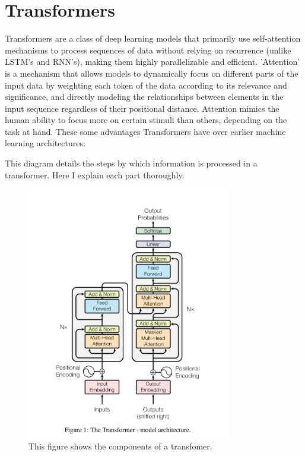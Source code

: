 \documentclass[12pt]{article}
\begin{document}
\section{Transformers}
Transformers are a class of deep learning models that primarily use self-attention mechanisms to process sequences of data without relying on recurrence (unlike LSTM's and RNN's), making them highly parallelizable and efficient. 'Attention' is a mechanism that allows models to dynamically focus on different parts of the input data by weighting each token of the data according to its relevance and significance, and directly modeling the relationships between elements in the input sequence regardless of their positional distance. Attention mimics the human ability to focus more on certain stimuli than others, depending on the task at hand. These some advantages Transformers have over earlier machine learning architectures: 

This diagram details the steps by which information is processed in a transformer. Here I explain each part thoroughly.

\begin{figure}[H]
    \centering
    \includegraphics[width=0.8\textwidth]{./Transformer_Architecture.png} %
    \caption{This figure shows the components of a transfomer.}
    \label{fig:gaussian_kde}
\end{figure}
\end{document}
